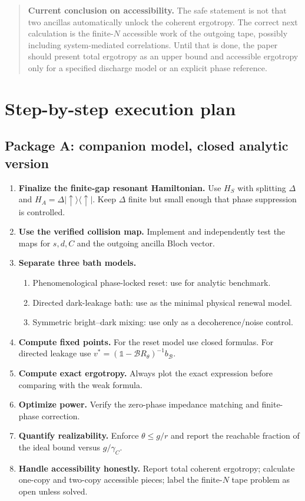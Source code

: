 \documentclass[11pt,a4paper]{article}
\newcommand{\proj}[1]{|#1\rangle\langle #1|}
\newcommand{\id}{\mathbb{1}}
\newenvironment{notebox}{\begin{quote}\small}{\end{quote}}
\begin{document}
\begin{notebox}
\textbf{Current conclusion on accessibility.} The safe statement is not that two ancillas automatically unlock the coherent ergotropy. The correct next calculation is the finite-$N$ accessible work of the outgoing tape, possibly including system-mediated correlations. Until that is done, the paper should present total ergotropy as an upper bound and accessible ergotropy only for a specified discharge model or an explicit phase reference.
\end{notebox}

\section{Step-by-step execution plan}

\subsection{Package A: companion model, closed analytic version}

\begin{enumerate}
\item \textbf{Finalize the finite-gap resonant Hamiltonian.} Use $H_S$ with splitting $\Delta$ and $H_A=\Delta\proj{\uparrow}$. Keep $\Delta$ finite but small enough that phase suppression is controlled.
\item \textbf{Use the verified collision map.} Implement and independently test the maps for $s,d,C$ and the outgoing ancilla Bloch vector.
\item \textbf{Separate three bath models.}
  \begin{enumerate}
  \item Phenomenological phase-locked reset: use for analytic benchmark.
  \item Directed dark-leakage bath: use as the minimal physical renewal model.
  \item Symmetric bright--dark mixing: use only as a decoherence/noise control.
  \end{enumerate}
\item \textbf{Compute fixed points.} For the reset model use closed formulas. For directed leakage use $v^*=(\id-\mathcal B R_\theta)^{-1}b_{\mathcal B}$.
\item \textbf{Compute exact ergotropy.} Always plot the exact expression before comparing with the weak formula.
\item \textbf{Optimize power.} Verify the zero-phase impedance matching and finite-phase correction.
\item \textbf{Quantify realizability.} Enforce $\theta\le g/r$ and report the reachable fraction of the ideal bound versus $g/\gamma_C$.
\item \textbf{Handle accessibility honestly.} Report total coherent ergotropy; calculate one-copy and two-copy accessible pieces; label the finite-$N$ tape problem as open unless solved.
\end{enumerate}
\end{document}
